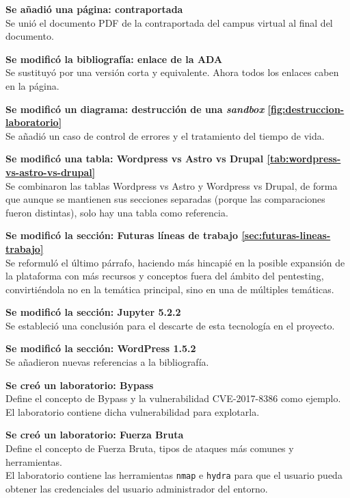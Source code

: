         \textbf{Se añadió una página: contraportada} \\
        Se unió el documento PDF de la contraportada del campus virtual al final del documento.

        \textbf{Se modificó la bibliografía: enlace de la ADA \cite{articulo-ada}} \\
        Se sustituyó por una versión corta y equivalente. Ahora todos los enlaces caben en la página.

        \textbf{Se modificó un diagrama: destrucción de una \textit{sandbox} \ref{fig:destruccion-laboratorio}} \\
        Se añadió un caso de control de errores y el tratamiento del tiempo de vida.

        \textbf{Se modificó una tabla: Wordpress vs Astro vs Drupal \ref{tab:wordpress-vs-astro-vs-drupal}} \\
        Se combinaron las tablas Wordpress vs Astro y Wordpress vs Drupal, de forma que aunque se mantienen sus secciones separadas (porque las comparaciones fueron distintas), solo hay una tabla como referencia.

        \textbf{Se modificó la sección: Futuras líneas de trabajo \ref{sec:futuras-lineas-trabajo}} \\
        Se reformuló el último párrafo, haciendo más hincapié en la posible expansión de la plataforma con más recursos y conceptos fuera del ámbito del pentesting, convirtiéndola no en la temática principal, sino en una de múltiples temáticas.

        \textbf{Se modificó la sección: Jupyter 5.2.2} \\
        Se estableció una conclusión para el descarte de esta tecnología en el proyecto.

        \textbf{Se modificó la sección: WordPress 1.5.2} \\
        Se añadieron nuevas referencias a la bibliografía.

        \textbf{Se creó un laboratorio: Bypass} \\
        Define el concepto de Bypass y la vulnerabilidad CVE-2017-8386 como ejemplo. \\
        El laboratorio contiene dicha vulnerabilidad para explotarla.
        
        \textbf{Se creó un laboratorio: Fuerza Bruta} \\
        Define el concepto de Fuerza Bruta, tipos de ataques más comunes y herramientas. \\
        El laboratorio contiene las herramientas \texttt{nmap} e \texttt{hydra} para que el usuario pueda obtener las credenciales del usuario administrador del entorno.
        
